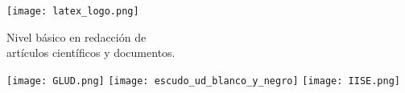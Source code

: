 

\begin{frame}
   
    \begin{center}
    
        \texttt{[image: latex\_logo.png]}
           
         \vspace{0.4cm}
        Nivel básico en redacción de \\artículos científicos y documentos.\\
       \vspace{0.3cm}
        
        \texttt{[image: GLUD.png]}
        \texttt{[image: escudo\_ud\_blanco\_y\_negro]}
        \texttt{[image: IISE.png]}
    
    \end{center}

\end{frame}
